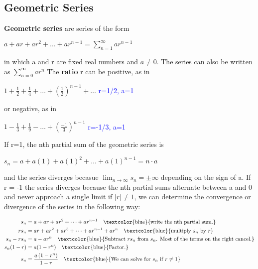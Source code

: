 \documentclass[12pt,a4paper]{article}
\begin{document}
\subsection{Geometric Series}

\textbf{Geometric series} are series of the form


\begin{center}
    \(a + ar + ar^2 + \dots + ar^{n-1} = \sum\limits_{n=1}^{\infty}ar^{n-1}\)
\end{center}

in which a and r are fixed real numbers and $a\neq0$. The series can also be written as $\sum_{n=0}^{\infty}ar^{n}$ The \textbf{ratio} r can be positive, as in

\begin{center}
    \(1 + \frac{1}{2} + \frac{1}{4} + \dots + \left(\frac{1}{2}\right)^{n-1} + \dots\) \textcolor{blue}{ r=1/2, a=1}
\end{center}

or negative, as in

\begin{center}
    \(
    1 - \frac{1}{3} + \frac{1}{9} - \dots + \left(\frac{-1}{3}\right)^{n-1} \) \textcolor{blue}{r=-1/3, a=1}

\end{center}

If r=1, the nth partial sum of the geometric series is
\begin{center}
    \(s_n = a+ a(1)+ a(1)^2 + \dots + a(1)^{n-1} = n \cdot a \)
\end{center}
and the series diverges becasue $\lim_{n \to \infty}s_n=\pm \infty$ depending on the sign of a. If r = -1 the series diverges because the nth partial sums alternate between a and 0 and never approach a single limit if $|r| \neq 1$, we can determine the convergence or divergence of the series in the following way:

\begin{align*}
    s_n &= a + ar + ar^2 + \dots + ar^{n-1} \quad \text{\textcolor{blue}{write the nth partial sum.}} \\
    rs_n &= ar+ ar^2 + ar^3 + \dots + ar^{n-1} +  ar^{n} \quad \text{\textcolor{blue}{multiply \(s_n \) by \(r\)}} \\
    s_n - rs_n &= a - ar^n \quad \text{\textcolor{blue}{Subtract  \(rs_n\) from \(s_n\). Most of the terms on the right cancel.}} \\
    s_n(1-r) &= a(1-r^n) \quad \text{\textcolor{blue}{Factor.}} \\
    s_n &= \frac{a\left(1-r^n\right)}{1-r} \quad \text{\textcolor{blue}{We can solve for \(s_n\) if \(r \neq 1\)}} \\
\end{align*}
\end{document}

